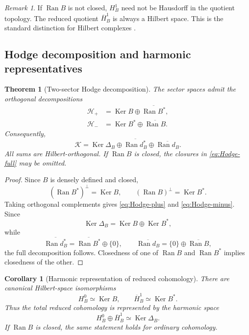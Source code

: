 \documentclass[11pt,reqno]{scrartcl}
\newcommand{\scrK}{\mathscr K}
\newcommand{\scrHp}{\mathscr H_{+}}
\newcommand{\scrHm}{\mathscr H_{-}}
\newcommand{\DeltaB}{\Delta}
\DeclareMathOperator{\Ran}{Ran}
\DeclareMathOperator{\Ker}{Ker}
\theoremstyle{plain}
\newtheorem{theorem}{Theorem}[section]
\newtheorem{corollary}[corollary]{Corollary}
\theoremstyle{definition}
\theoremstyle{remark}
\newtheorem{remark}[remark]{Remark}
\begin{document}
\begin{remark}
If \(\Ran B\) is not closed, \(H_B^1\) need not be Hausdorff in the quotient
topology.  The reduced quotient \(\overline H_B^1\) is always a Hilbert
space.  This is the standard distinction for Hilbert complexes
\cite{BruningLesch}.
\end{remark}

\subsection{Hodge decomposition and harmonic representatives}

\begin{theorem}[Two-sector Hodge decomposition]
\label{thm:Hodge-decomposition}
The sector spaces admit the orthogonal decompositions
\begin{align}
  \scrHp
  &=\Ker B\oplus\overline{\Ran B^*},
  \label{eq:Hodge-plus}\\
  \scrHm
  &=\Ker B^*\oplus\overline{\Ran B}.
  \label{eq:Hodge-minus}
\end{align}
Consequently,
\begin{equation}
  \boxed{
  \scrK
  =\Ker\DeltaB_B
   \oplus\overline{\Ran d_B^*}
   \oplus\overline{\Ran d_B}.}
  \label{eq:Hodge-full}
\end{equation}
All sums are Hilbert-orthogonal.  If \(\Ran B\) is closed, the closures in
\eqref{eq:Hodge-full} may be omitted.
\end{theorem}

\begin{proof}
Since \(B\) is densely defined and closed,
\begin{equation}
  (\Ran B^*)^\perp=\Ker B,
  \qquad
  (\Ran B)^\perp=\Ker B^*.
\end{equation}
Taking orthogonal complements gives \eqref{eq:Hodge-plus} and
\eqref{eq:Hodge-minus}.  Since
\begin{equation}
  \Ker\DeltaB_B=\Ker B\oplus\Ker B^*,
\end{equation}
while
\begin{equation}
  \overline{\Ran d_B^*}
  =\overline{\Ran B^*}\oplus\{0\},
  \qquad
  \overline{\Ran d_B}
  =\{0\}\oplus\overline{\Ran B},
\end{equation}
the full decomposition follows.  Closedness of one of \(\Ran B\) and
\(\Ran B^*\) implies closedness of the other.
\end{proof}

\begin{corollary}[Harmonic representation of reduced cohomology]
\label{cor:harmonic-representatives}
There are canonical Hilbert-space isomorphisms
\begin{equation}
  H_B^0\simeq\Ker B,
  \qquad
  \overline H_B^1\simeq\Ker B^*.
  \label{eq:harmonic-cohomology}
\end{equation}
Thus the total reduced cohomology is represented by the harmonic space
\begin{equation}
  H_B^0\oplus\overline H_B^1
  \simeq\Ker\DeltaB_B.
  \label{eq:total-harmonic}
\end{equation}
If \(\Ran B\) is closed, the same statement holds for ordinary cohomology.
\end{corollary}
\end{document}

